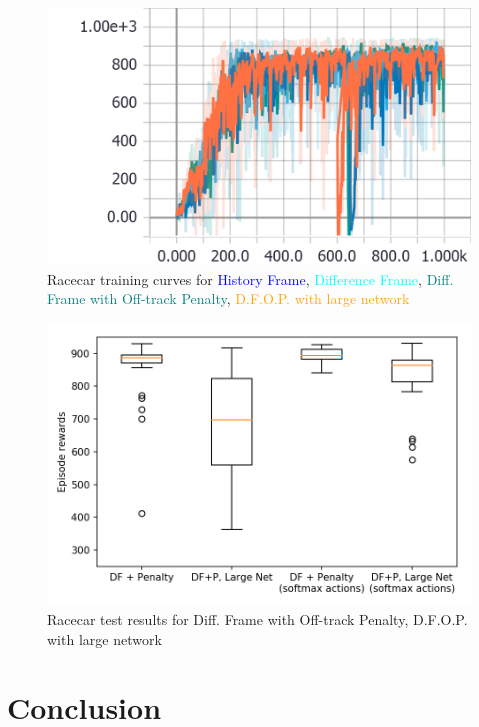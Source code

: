 \documentclass[a4paper, 11pt, conference]{ieeeconf}      %
\begin{document}
\begin{figure}
  \includegraphics[width=\linewidth]{figs/racecar_train_5678.png}
  \caption{Racecar training curves for \textcolor{blue}{History Frame}, \textcolor{cyan}{Difference Frame}, \textcolor{teal}{Diff. Frame with Off-track Penalty}, \textcolor{orange}{D.F.O.P. with large network}}
  \label{fig:train5678}
\end{figure}

\begin{figure}
  \includegraphics[width=\linewidth]{figs/racecar_4.png}
  \caption{Racecar test results for Diff. Frame with Off-track Penalty, D.F.O.P. with large network}
  \label{fig:test4}
\end{figure}

\section*{Conclusion}
\end{document}
